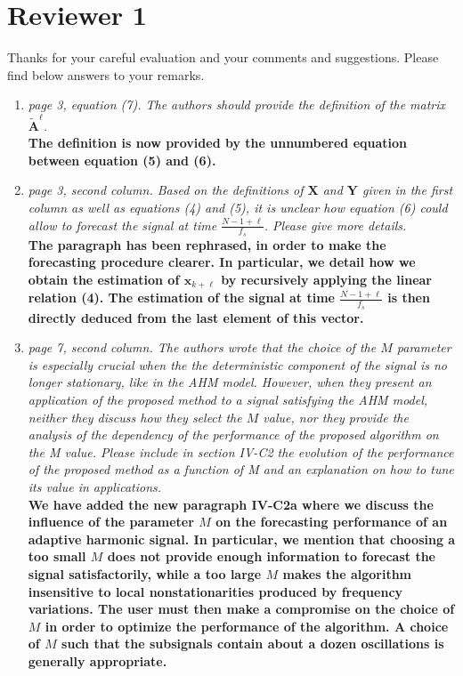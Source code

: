 \documentclass[11pt,DIV=16]{scrartcl}
\begin{document}
\section*{Reviewer 1}
Thanks for your careful evaluation and your comments and suggestions. Please find below answers to your remarks.
\begin{enumerate}[1)]
\item
\textit{page 3, equation (7). The authors should provide the definition of the matrix $\tilde{\mathbf{A}}^\ell$.}\\
\textbf{The definition is now provided by the unnumbered equation between equation (5) and (6).}
\item
\textit{page 3, second column. Based on the definitions of $\mathbf{X}$ and $\mathbf{Y}$ given in the first column as well as equations (4) and (5), it is unclear how equation (6) could allow to forecast the signal at time $\frac{N-1+\ell}{f_s}$. Please give more details.}\\
\textbf{The paragraph has been rephrased, in order to make the forecasting procedure clearer. In particular, we detail how we obtain the estimation of $\mathbf{x}_{k+\ell}$ by recursively applying the linear relation (4). The estimation of the signal at time $\frac{N-1+\ell}{f_s}$ is then directly deduced from the last element of this vector.}
\item
\textit{page 7, second column. The authors wrote that the choice of the $M$ parameter is especially crucial when the the deterministic component of the signal is no longer stationary, like in the AHM model.
However, when they present an application of the proposed method to a signal satisfying the AHM model, neither they discuss how they select the $M$ value, nor they provide the analysis of the dependency of the performance of the proposed algorithm on the M value. Please include in section IV-C2 the evolution of the performance of the proposed method as a function of M and an explanation on how to tune its value in applications.}\\
\textbf{We have added the new paragraph IV-C2a where we discuss the influence of the parameter $M$ on the forecasting performance of an adaptive harmonic signal. In particular, we mention that choosing a too small $M$ does not provide enough information to forecast the signal satisfactorily, while a too large $M$ makes the algorithm insensitive to local nonstationarities produced by frequency variations. The user must then make a compromise on the choice of $M$ in order to optimize the performance of the algorithm. A choice of $M$ such that the subsignals contain about a dozen oscillations is generally appropriate.}

\end{enumerate}
\end{document}
